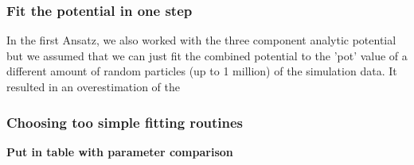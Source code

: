 \subsubsection{Fit the potential in one step}
In the first Ansatz, we also worked with the three component analytic potential but we assumed that we can just fit the combined potential to the 'pot' value of a different amount of random particles (up to 1 million) of the simulation data. It resulted in an overestimation of the 



\subsubsection{Choosing too simple fitting routines}




\textbf{Put in table with parameter comparison }